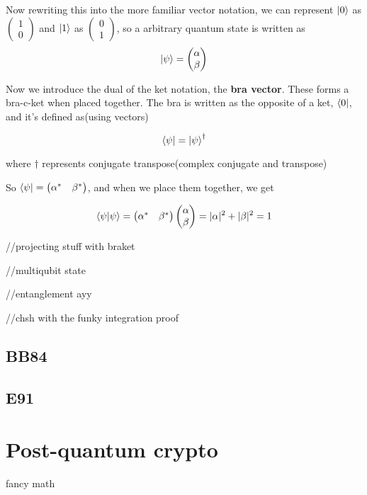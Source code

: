 \documentclass{report}
\begin{document}
Now rewriting this into the more familiar vector notation, we can represent $\ket{0}$ as $\begin{pmatrix}1\\0\end{pmatrix}$ and $\ket{1}$ as $\begin{pmatrix}0\\1\end{pmatrix}$, so a arbitrary quantum state is written as
$$\ket{\psi}=\begin{pmatrix}\alpha\\\beta\end{pmatrix}$$

Now we introduce the dual of the ket notation, the \textbf{bra vector}. These forms a bra-c-ket when placed together. The bra is written as the opposite of a ket, $\bra{0}$, and it's defined as(using vectors)

$$\bra{\psi}=\ket{\psi}^\dagger$$

where $\dagger$ represents conjugate transpose(complex conjugate and transpose)

So $\bra{\psi}=\begin{pmatrix}\alpha^*&\beta^*\end{pmatrix}$, and when we place them together, we get

$$\braket{\psi}{\psi}=\begin{pmatrix}\alpha^*&\beta^*\end{pmatrix}\begin{pmatrix}\alpha\\\beta\end{pmatrix}=|\alpha|^2+|\beta|^2=1$$

//projecting stuff with braket

//multiqubit state

//entanglement ayy

//chsh with the funky integration proof

\chapter{BB84}
\chapter{E91}
\part{Post-quantum crypto}
fancy math
\end{document}
